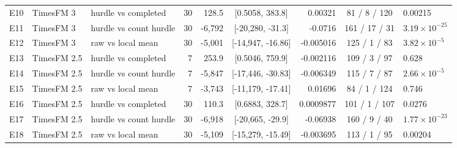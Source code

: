 \begin{table}[t]
\begin{tabular}{lllrrcrcl}
E10 & TimesFM 3 & hurdle vs completed & 30 & 128.5 & [0.5058, 383.8] & 0.00321 & 81 / 8 / 120 & 0.00215 \\
E11 & TimesFM 3 & hurdle vs count hurdle & 30 & -6,792 & [-20,280, -31.3] & -0.0716 & 161 / 17 / 31 & $3.19 \times 10^{-25}$ \\
E12 & TimesFM 3 & raw vs local mean & 30 & -5,001 & [-14,947, -16.86] & -0.005016 & 125 / 1 / 83 & $3.82 \times 10^{-5}$ \\
E13 & TimesFM 2.5 & hurdle vs completed & 7 & 253.9 & [0.5046, 759.9] & -0.002116 & 109 / 3 / 97 & 0.628 \\
E14 & TimesFM 2.5 & hurdle vs count hurdle & 7 & -5,847 & [-17,446, -30.83] & -0.006349 & 115 / 7 / 87 & $2.66 \times 10^{-5}$ \\
E15 & TimesFM 2.5 & raw vs local mean & 7 & -3,743 & [-11,179, -17.41] & 0.01696 & 84 / 1 / 124 & 0.746 \\
E16 & TimesFM 2.5 & hurdle vs completed & 30 & 110.3 & [0.6883, 328.7] & 0.0009877 & 101 / 1 / 107 & 0.0276 \\
E17 & TimesFM 2.5 & hurdle vs count hurdle & 30 & -6,918 & [-20,665, -29.9] & -0.06938 & 160 / 9 / 40 & $1.77 \times 10^{-23}$ \\
E18 & TimesFM 2.5 & raw vs local mean & 30 & -5,109 & [-15,279, -15.49] & -0.003695 & 113 / 1 / 95 & 0.00204 \\
\bottomrule
\end{tabular}
\end{table}

